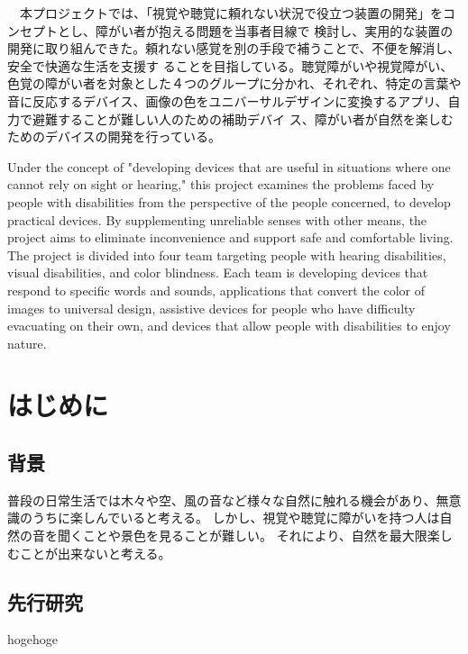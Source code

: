 \documentclass[12pt,a4paper]{report}
\begin{document}
{
    \centerline{
      \huge{}
    }
    \vspace{1cm}
    \noindent
    　本プロジェクトでは、「視覚や聴覚に頼れない状況で役立つ装置の開発」をコンセプトとし、障がい者が抱える問題を当事者目線で
検討し、実用的な装置の開発に取り組んできた。頼れない感覚を別の手段で補うことで、不便を解消し、安全で快適な生活を支援す
ることを目指している。聴覚障がいや視覚障がい、色覚の障がい者を対象とした４つのグループに分かれ、それぞれ、特定の言葉や
音に反応するデバイス、画像の色をユニバーサルデザインに変換するアプリ、自力で避難することが難しい人のための補助デバイ
ス、障がい者が自然を楽しむためのデバイスの開発を行っている。

}
\newpage
{
    \centerline{
      \textbf{\huge{}}
    }
    \vspace{1cm}
    \noindent
    \space Under the concept of "developing devices that are useful in situations where one cannot rely on sight or hearing," this project examines the
problems faced by people with disabilities from the perspective of the people concerned, to develop practical devices. By supplementing
unreliable senses with other means, the project aims to eliminate inconvenience and support safe and comfortable living. The project is
divided into four team targeting people with hearing disabilities, visual disabilities, and color blindness. Each team is developing devices that
respond to specific words and sounds, applications that convert the color of images to universal design, assistive devices for people who
have difficulty evacuating on their own, and devices that allow people with disabilities to enjoy nature.

}
\newpage

\tableofcontents
\newpage

\chapter{はじめに}
\section{背景}
\noindent\space
普段の日常生活では木々や空、風の音など様々な自然に触れる機会があり、無意識のうちに楽しんでいると考える。
しかし、視覚や聴覚に障がいを持つ人は自然の音を聞くことや景色を見ることが難しい。
それにより、自然を最大限楽しむことが出来ないと考える。
\section{先行研究}
\noindent
hogehoge
\end{document}
